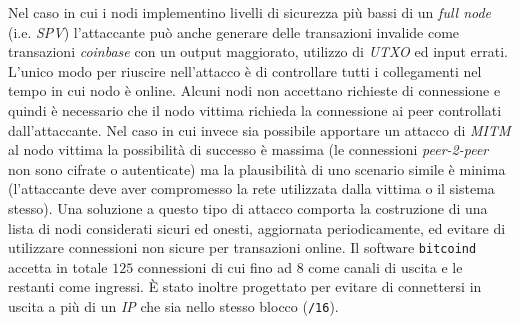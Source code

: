 Nel caso in cui i nodi implementino livelli di sicurezza più bassi di un \textit{full node} (i.e. \textit{SPV}) l'attaccante può anche generare delle transazioni invalide come transazioni \textit{coinbase} con un output maggiorato, utilizzo di \textit{UTXO} ed input errati.\newline
L'unico modo per riuscire nell'attacco è di controllare tutti i collegamenti nel tempo in cui nodo è online. Alcuni nodi non accettano richieste di connessione  e quindi è necessario che il nodo vittima richieda la connessione ai peer controllati dall'attaccante. Nel caso in cui invece sia possibile apportare un attacco di \textit{MITM} al nodo vittima la possibilità di successo è massima (le connessioni \textit{peer-2-peer} non sono cifrate o autenticate) ma la plausibilità di uno scenario simile è minima (l'attaccante deve aver compromesso la rete utilizzata dalla vittima o il sistema stesso).\newline
Una soluzione a questo tipo di attacco comporta la costruzione di una lista di nodi considerati sicuri ed onesti, aggiornata periodicamente, ed evitare di utilizzare connessioni non sicure per transazioni online.\newline
Il software \texttt{bitcoind} accetta in totale $125$ connessioni di cui fino ad $8$ come canali di uscita e le restanti come ingressi. È stato inoltre progettato per evitare di connettersi in uscita a più di un \textit{IP} che sia nello stesso blocco (\texttt{/16}).

